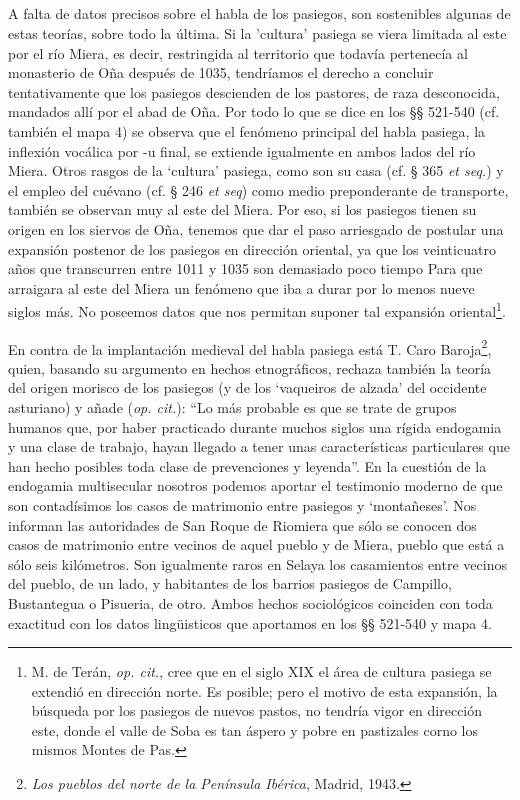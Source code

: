 \documentclass[11pt,spanish,b5paper]{book}
\begin{document}
\subsection{} A falta de datos precisos sobre el habla de los pasiegos, son sostenibles algunas de estas teorías, sobre todo la última. Si la 'cultura' pasiega se viera limitada al este por el río Miera, es decir, restringida al territorio que todavía pertenecía al monasterio de Oña después de 1035, tendríamos el derecho a concluir tentativamente que los pasiegos
descienden de los pastores, de raza desconocida, mandados allí por el abad de Oña. Por todo lo que se dice en los §§ 521-540 (cf. también el mapa 4) se observa que el fenómeno principal del habla pasiega, la inflexión vocálica por -u final, se extiende igualmente en ambos lados del río Miera. Otros rasgos de la `cultura' pasiega, como son su casa (cf. § 365 \emph{et seq.}) y el empleo del cuévano (cf. § 246 \emph{et seq}) como medio preponderante de transporte, también se observan muy al este del Miera. Por eso, si los pasiegos tienen su origen en los siervos de Oña, tenemos que dar el paso arriesgado de postular una expansión postenor de los pasiegos en dirección oriental, ya que los veinticuatro años que transcurren entre 1011 y 1035 son demasiado poco tiempo Para que arraigara al este del Miera un fenómeno que iba a durar por lo menos nueve siglos más. No poseemos datos que nos permitan suponer tal expansión oriental\footnote{M. de Terán, \emph{op. cit.}, cree que en el siglo XIX el área de cultura pasiega se extendió en dirección norte. Es posible; pero el motivo de esta expansión, la búsqueda por los pasiegos de nuevos pastos, no tendría vigor en dirección este, donde el valle de Soba es tan áspero y pobre en pastizales corno los mismos Montes de Pas.}.


En contra de la implantación medieval del habla pasiega está T. Caro Baroja\footnote{\emph{Los pueblos del norte de la Península Ibérica}, Madrid, 1943.}, quien, basando su argumento en hechos etnográficos, rechaza también la teoría del origen morisco de los pasiegos (y de los  `vaqueiros de alzada' del occidente asturiano) y añade (\emph{op. cit.}): ``Lo más probable es que se trate de grupos humanos que, por haber practicado durante muchos siglos una rígida endogamia y una clase de trabajo, hayan llegado a tener unas características particulares que han hecho posibles toda clase de prevenciones y leyenda''. En la cuestión de la endogamia multisecular nosotros podemos aportar el testimonio moderno de que son contadísimos los casos de matrimonio entre pasiegos y `montañeses'. Nos informan las autoridades de San Roque de Riomiera que sólo se conocen dos casos de matrimonio entre vecinos de aquel pueblo y de Miera, pueblo que está a sólo seis kilómetros. Son igualmente raros en Selaya los casamientos entre vecinos del pueblo, de un lado, y habitantes de los barrios pasiegos de Campillo, Bustantegua o Pisueria, de otro. Ambos hechos sociológicos coinciden con toda exactitud con los datos lingüisticos que aportamos en los §§ 521-540 y mapa 4.
\end{document}

